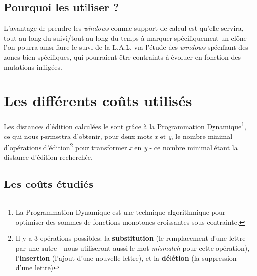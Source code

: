 \documentclass[12pt]{report}
\begin{document}
\begin{spacing}{1.2}
\subsection{Pourquoi les utiliser ?}

L'avantage de prendre les \textit{windows} comme support de calcul est qu'elle servira, tout au long du suivi/tout au long du temps à marquer spécifiquement un clône - l'on pourra ainsi faire le suivi de la L.A.L. via l'étude des \textit{windows} spécifiant des zones bien spécifiques, qui pourraient être contraints à évoluer en fonction des mutations infligées.

\section{Les différents coûts utilisés}

Les distances d'édition calculées le sont grâce à la Programmation Dynamique\footnote{La Programmation Dynamique est une technique algorithmique pour optimiser des sommes de fonctions monotones croissantes sous contrainte.}, ce qui nous permettra d'obtenir, pour deux mots \textit{x} et \textit{y}, le nombre minimal d’opérations d’édition\footnote{Il y a 3 opérations possibles: la \textbf{substitution} (le remplacement d'une lettre par une autre - nous utiliseront aussi le mot \textit{mismatch} pour cette opération), l'\textbf{insertion} (l'ajout d'une nouvelle lettre), et la \textbf{délétion} (la suppression d'une lettre)} pour transformer \textit{x} en \textit{y} - ce nombre minimal étant la distance d'édition recherchée.

\subsection{Les coûts étudiés}


\end{spacing}
\end{document}
